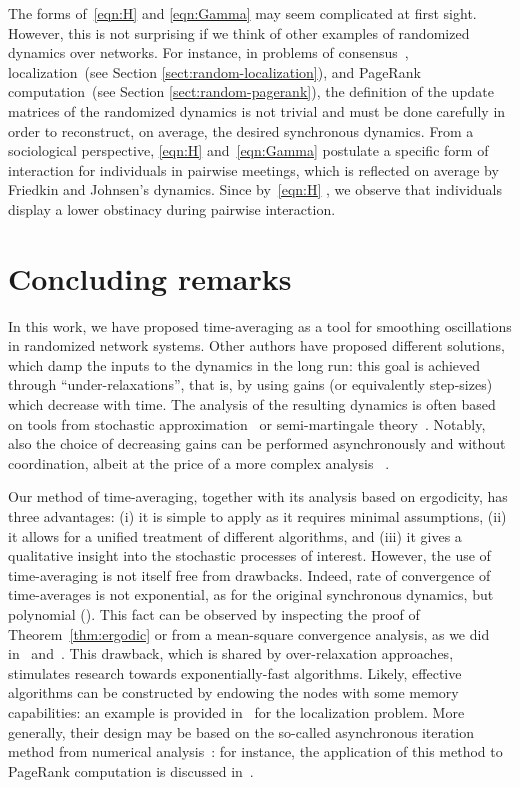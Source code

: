 \documentclass{IEEEtran}
\newcommand{\1}{\mathbf{1}} \newcommand{\ind}{\mathds{1}}
\begin{document}
The forms of~\eqref{eqn:H} and \eqref{eqn:Gamma} may seem complicated at first sight. However, this is not surprising if we think of other examples of randomized dynamics over networks. For instance, in problems of consensus~\cite{FF-SZ:08a}, localization~(see Section \ref{sect:random-localization}), and PageRank computation~(see Section \ref{sect:random-pagerank}), the definition of the update matrices of the randomized dynamics is not trivial and must be done carefully in order to reconstruct, on average, the desired synchronous dynamics.
From a sociological perspective, \eqref{eqn:H} and~\eqref{eqn:Gamma} postulate a specific form of interaction for individuals in pairwise meetings, which is reflected on average by Friedkin and Johnsen's dynamics. Since by~\eqref{eqn:H} , we observe that individuals display a lower obstinacy during pairwise interaction.


\section{Concluding remarks}\label{sect:conclusion}
In this work, we have proposed time-averaging as a tool for smoothing oscillations in randomized network systems.  Other authors have proposed different solutions, which damp the inputs to the dynamics in the long run: this goal is achieved through ``under-relaxations'', that is, by using gains (or equivalently step-sizes) which decrease with time.
The analysis of the resulting dynamics is often based on tools from stochastic approximation~\cite{VSB:08} or semi-martingale theory~\cite[Ch~2]{BP:87}. Notably, also the choice of decreasing gains can be performed asynchronously and without coordination, albeit at the price of a more complex analysis~\cite[Ch.~7]{VSB:08} \cite{AN:11}.


Our method of time-averaging, together with its analysis based on ergodicity, has three advantages:  (i) it is simple to apply as it requires minimal assumptions, (ii) it allows for a unified treatment of different algorithms, and (iii) it gives a qualitative insight into the stochastic processes of interest. 
However, the use of time-averaging is not itself free from drawbacks. Indeed, rate of convergence of time-averages is not exponential, as for the original synchronous dynamics, but polynomial ().
This fact can be observed by inspecting the proof of Theorem~\ref{thm:ergodic} or from a mean-square convergence analysis, as we did in~\cite{HI-RT:10} and~\cite{CR-PF-HI-RT:13a}.
This drawback, which is shared by over-relaxation approaches, stimulates research towards exponentially-fast algorithms. Likely, effective algorithms can be constructed by endowing the nodes with some memory capabilities: an example is provided in~\cite{RC-AC-LS-MT:13} for the localization problem. More generally, their design may be based on the so-called asynchronous iteration method from numerical analysis~\cite[Section 6.2]{DPB-JNT:89}: for instance, the application of this method to PageRank computation is discussed in~\cite[Section~VII]{HI-RT:10}.
\end{document}
